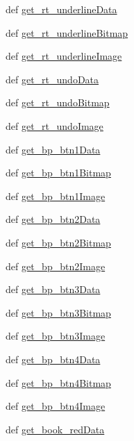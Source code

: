 \begin{DoxyCompactItemize}
def \hyperlink{namespaceimages_aeee8105f03feeabe64768960e9213caf}{get\_\-rt\_\-underlineData}
\item 
def \hyperlink{namespaceimages_a848a27bef158a8f148e4f158cbc33c9b}{get\_\-rt\_\-underlineBitmap}
\item 
def \hyperlink{namespaceimages_af85929d1b5c32074a2d5897da11021ba}{get\_\-rt\_\-underlineImage}
\item 
def \hyperlink{namespaceimages_aab6300bcf2d40129d969990f5a6fc304}{get\_\-rt\_\-undoData}
\item 
def \hyperlink{namespaceimages_af8fcc2066fa4aa9f5606d3215380fd8d}{get\_\-rt\_\-undoBitmap}
\item 
def \hyperlink{namespaceimages_a4bc7ca76b261bd457492cc317fc80ca0}{get\_\-rt\_\-undoImage}
\item 
def \hyperlink{namespaceimages_a3dca1e8587b75029c624426a5d696834}{get\_\-bp\_\-btn1Data}
\item 
def \hyperlink{namespaceimages_af839364a4b39a89450c1c11f55c066a8}{get\_\-bp\_\-btn1Bitmap}
\item 
def \hyperlink{namespaceimages_a79ed545ac552325591a242dac530723d}{get\_\-bp\_\-btn1Image}
\item 
def \hyperlink{namespaceimages_af4e6b090a70618d97bfa1ca3928ed5e9}{get\_\-bp\_\-btn2Data}
\item 
def \hyperlink{namespaceimages_acb591e076316df58c32d63f603891b92}{get\_\-bp\_\-btn2Bitmap}
\item 
def \hyperlink{namespaceimages_a89debfa9896f78ae72134d2fac509e61}{get\_\-bp\_\-btn2Image}
\item 
def \hyperlink{namespaceimages_ac519a27c44d55628abd4b8c9024a4063}{get\_\-bp\_\-btn3Data}
\item 
def \hyperlink{namespaceimages_a37abae78c16f7a4fd73a6bb3354a4544}{get\_\-bp\_\-btn3Bitmap}
\item 
def \hyperlink{namespaceimages_aeb14f71aa6488f2ac82b7e2da47e1c8f}{get\_\-bp\_\-btn3Image}
\item 
def \hyperlink{namespaceimages_aed1b918372f0dd263496d5b64aa18e2a}{get\_\-bp\_\-btn4Data}
\item 
def \hyperlink{namespaceimages_aaba6f741c4eaf30cd8f7e1f91ed56bcc}{get\_\-bp\_\-btn4Bitmap}
\item 
def \hyperlink{namespaceimages_a1cef99bd242a79cd98ae9a8b21ef4fd6}{get\_\-bp\_\-btn4Image}
\item 
def \hyperlink{namespaceimages_a5cc41b7333c044a8e3ff244a60f83731}{get\_\-book\_\-redData}
\item 

\end{DoxyCompactItemize}

